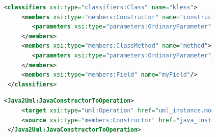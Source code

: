 \begin{figure}[H]
\centering
\begin{lstlisting}[language=xml, caption={Source Model Serialization}, captionpos=b, label=implSrcModelSerialization]
 <classifiers xsi:type="classifiers:Class" name="kless">
     <members xsi:type="members:Constructor" name="constructer">
        <parameters xsi:type="parameters:OrdinaryParameter" name="parrametr"/>
     </members>
     <members xsi:type="members:ClassMethod" name="methed">
        <parameters xsi:type="parameters:OrdinaryParameter"/>
     </members>
     <members xsi:type="members:Field" name="myField"/>
 </classifiers>
\end{lstlisting}     
\end{figure}

\begin{figure}[H]
\centering
\begin{lstlisting}[language=xml, caption={Correspondence Model Serialization},captionpos=b, label=implCorrGraphSerialization]
 <Java2Uml:JavaConstructorToOperation>
     <target xsi:type="uml:Operation" href="uml_instance.model#/0/@packagedElement.0/@ownedOperation.0"/>
     <source xsi:type="members:Constructor" href="java_instance.model#//@compilationUnits.0/@classifiers.0/@members.0"/>
 </Java2Uml:JavaConstructorToOperation>
\end{lstlisting}       
\end{figure} 
